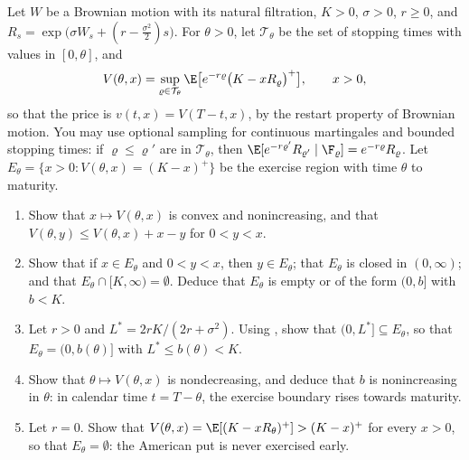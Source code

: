 \begin{exercise}\label{ex:num-american-region}
\hard Let $W$ be a Brownian motion with its natural filtration, $K>0$, $\sigma>0$, $r\ge0$, and
$R_s=\exp\big(\sigma W_s+(r-\frac{\sigma^2}2)s\big)$. For $\theta>0$, let $\mathcal T_\theta$ be the set of
stopping times with values in $[0,\theta]$, and
\[
  V(\theta,x)=\sup_{\varrho\in\mathcal T_\theta}\E\big[e^{-r\varrho}\big(K-xR_\varrho\big)^+\big],\qquad x>0,
\]
so that the price  is $v(t,x)=V(T-t,x)$, by the restart property of Brownian
motion. You may use optional sampling for continuous martingales and bounded stopping times: if
$\varrho\le\varrho'$ are in $\mathcal T_\theta$, then $\E[e^{-r\varrho'}R_{\varrho'}\mid\F_\varrho]=e^{-r\varrho}R_\varrho$.
Let $E_\theta=\{x>0:V(\theta,x)=(K-x)^+\}$ be the exercise region with time $\theta$ to maturity.
\begin{enumerate}[label=(\alph*)]
  \item Show that $x\mapsto V(\theta,x)$ is convex and nonincreasing, and that
    $V(\theta,y)\le V(\theta,x)+x-y$ for $0<y<x$.
  \item Show that if $x\in E_\theta$ and $0<y<x$, then $y\in E_\theta$; that $E_\theta$ is closed in
    $(0,\infty)$; and that $E_\theta\cap[K,\infty)=\emptyset$. Deduce that $E_\theta$ is empty or of the form
    $(0,b]$ with $b<K$.
  \item Let $r>0$ and $L^*=2rK/(2r+\sigma^2)$. Using , show that
    $(0,L^*]\subseteq E_\theta$, so that $E_\theta=(0,b(\theta)]$ with $L^*\le b(\theta)<K$.
  \item Show that $\theta\mapsto V(\theta,x)$ is nondecreasing, and deduce that $b$ is nonincreasing in
    $\theta$: in calendar time $t=T-\theta$, the exercise boundary rises towards maturity.
  \item Let $r=0$. Show that $V(\theta,x)=\E[(K-xR_\theta)^+]>(K-x)^+$ for every $x>0$, so that
    $E_\theta=\emptyset$: the American put is never exercised early.
\end{enumerate}
\end{exercise}
